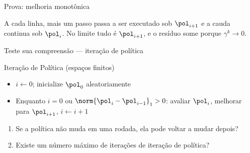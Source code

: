 \documentclass[aspectratio=169, 11pt]{beamer}
\begin{document}
\begin{frame}{Prova: melhoria monotônica}
  \begin{center}
  \end{center}
  \vspace{-0.4em}
  \begin{alertabox}
    A cada linha, mais um passo passa a ser executado sob $\pol_{i+1}$ e a cauda continua
    sob $\pol_i$. No limite tudo é $\pol_{i+1}$, e o resíduo some porque $\gamma^k \to 0$.
  \end{alertabox}
\end{frame}

\begin{frame}{Teste sua compreensão --- iteração de política}
  \begin{algbox}{Iteração de Política (espaços finitos)}
    \begin{itemize}\setlength{\itemsep}{0.2ex}
      \item $i \leftarrow 0$; inicialize $\pol_0$ aleatoriamente
      \item Enquanto $i=0$ ou $\norm{\pol_i - \pol_{i-1}}_1 > 0$: avaliar $\pol_i$,
            melhorar para $\pol_{i+1}$, $i \leftarrow i+1$
    \end{itemize}
  \end{algbox}
  \begin{quizbox}{}
    \begin{enumerate}\setlength{\itemsep}{0.3ex}
      \item Se a política \alert{não muda} em uma rodada, ela pode voltar a mudar depois?
      \item Existe um \alert{número máximo} de iterações de iteração de política?
    \end{enumerate}
  \end{quizbox}
\end{frame}
\end{document}
